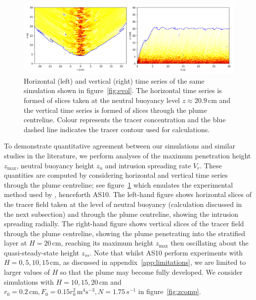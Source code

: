 \documentclass[a4paper]{article}
\begin{document}
\begin{figure}
	\centering
	\includegraphics[width=.9\textwidth]{timeseries}
	\caption{Horizontal (left) and vertical (right) time series of the same simulation shown in
		figure~\ref{fig:evol}. The horizontal time series is formed of slices taken at the neutral buoyancy
		level $z \approx 20.9 \, \mathrm{cm}$ and the vertical time series is formed of slices through the
		plume centreline. Colour represents the tracer concentration and the blue dashed line indicates the
		tracer contour used for calculations.}
	\label{fig:timeseries}
\end{figure}

To demonstrate quantitative agreement between our simulations and similar studies in the literature, we
perform analyses of the maximum penetration height $z_{\max}$, neutral buoyancy height $z_n$ and intrusion
spreading rate $V_r$. These quantities are computed by considering horizontal and vertical time series through
the plume centreline; see figure~\ref{fig:timeseries} which emulates the experimental method used by
\citet{ansong2010}, henceforth AS10. The left-hand figure shows horizontal slices of the tracer field taken
at the level of neutral buoyancy (calculation discussed in the next subsection) and through the plume
centreline, showing the intrusion spreading radially. The right-hand figure shows vertical slices of the
tracer field through the plume centreline, showing the plume penetrating into the stratified layer at $H=20 \,
\mathrm{cm}$, reaching its maximum height $z_{\max}$ then oscillating about the quasi-steady-state height
$z_{ss}$. Note that whilst AS10 perform experiments with $H = 0, 5, 10, 15 \, \mathrm{cm}$, as discussed in
appendix~\ref{app:limitations}, we are limited to larger values of $H$ so that the plume may become fully
developed. We consider simulations with $H = 10, 15, 20 \,\mathrm{cm}$ and $r_0 = 0.2 \, \mathrm{cm}, F_0 =
0.15r_0^2 \, \mathrm{m}^4 \mathrm{s}^{-3}, N = 1.75\,s^{-1}$ in figure~\ref{fig:zcomp}.
\end{document}
